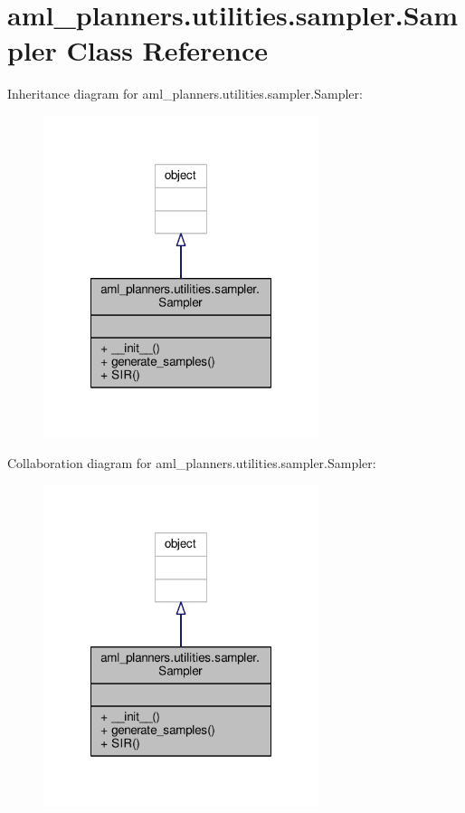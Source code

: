 \hypertarget{classaml__planners_1_1utilities_1_1sampler_1_1_sampler}{\section{aml\-\_\-planners.\-utilities.\-sampler.\-Sampler Class Reference}
\label{classaml__planners_1_1utilities_1_1sampler_1_1_sampler}
}


Inheritance diagram for aml\-\_\-planners.\-utilities.\-sampler.\-Sampler\-:\nopagebreak
\begin{figure}[H]
\begin{center}
\leavevmode
\includegraphics[width=228pt]{classaml__planners_1_1utilities_1_1sampler_1_1_sampler__inherit__graph}
\end{center}
\end{figure}


Collaboration diagram for aml\-\_\-planners.\-utilities.\-sampler.\-Sampler\-:\nopagebreak
\begin{figure}[H]
\begin{center}
\leavevmode
\includegraphics[width=228pt]{classaml__planners_1_1utilities_1_1sampler_1_1_sampler__coll__graph}
\end{center}
\end{figure}
